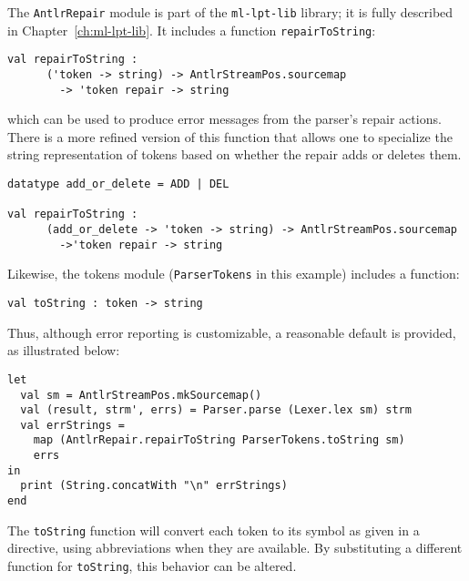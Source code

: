 The \texttt{AntlrRepair} module is part of the \texttt{ml-lpt-lib} library; it is fully described in Chapter~\ref{ch:ml-lpt-lib}.
It includes a function \texttt{repairToString}:
\begin{lstlisting}
val repairToString : 
      ('token -> string) -> AntlrStreamPos.sourcemap
        -> 'token repair -> string

\end{lstlisting}
which can be used to produce error messages from the parser's repair actions.
There is a more refined version of this function that allows one to specialize
the string representation of tokens based on whether the repair adds or deletes
them.
\begin{lstlisting}
datatype add_or_delete = ADD | DEL

val repairToString : 
      (add_or_delete -> 'token -> string) -> AntlrStreamPos.sourcemap
        ->'token repair -> string
\end{lstlisting}


Likewise, the tokens module (\texttt{ParserTokens} in this example) includes a function:
\begin{lstlisting}
val toString : token -> string
\end{lstlisting}
Thus, although error reporting is customizable, a reasonable default is provided, as illustrated below:
\begin{lstlisting}
let
  val sm = AntlrStreamPos.mkSourcemap()
  val (result, strm', errs) = Parser.parse (Lexer.lex sm) strm
  val errStrings = 
    map (AntlrRepair.repairToString ParserTokens.toString sm)
	errs
in
  print (String.concatWith "\n" errStrings)
end
\end{lstlisting}
The \texttt{toString} function will convert each token to its symbol as given in a  directive,
using abbreviations when they are available.
By substituting a different function for \texttt{toString}, this behavior can be altered.
